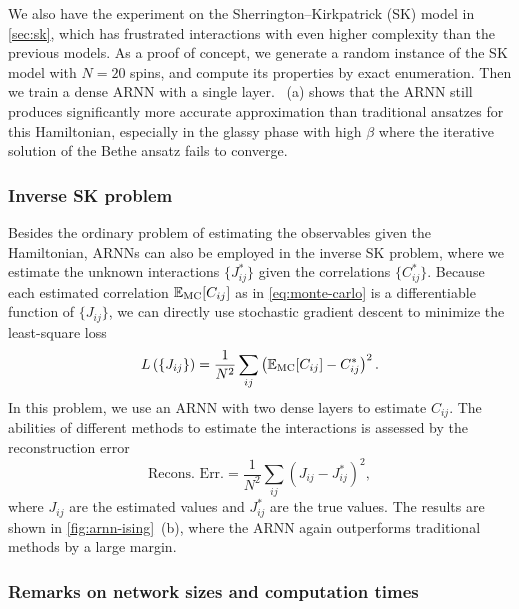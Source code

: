 We also have the experiment on the Sherrington--Kirkpatrick (SK) model in \cref{sec:sk}, which has frustrated interactions with even higher complexity than the previous models. As a proof of concept, we generate a random instance of the SK model with $N = 20$ spins, and compute its properties by exact enumeration. Then we train a dense ARNN with a single layer. ~(a) shows that the ARNN still produces significantly more accurate approximation than traditional ansatzes for this Hamiltonian, especially in the glassy phase with high $\beta$ where the iterative solution of the Bethe ansatz fails to converge.

\subsubsection{Inverse SK problem}

Besides the ordinary problem of estimating the observables given the Hamiltonian, ARNNs can also be employed in the inverse SK problem, where we estimate the unknown interactions $\{J^*_{i j}\}$ given the correlations $\{C^*_{i j}\}$. Because each estimated correlation $\mathbb{E}_\text{MC}[C_{i j}]$ as in \cref{eq:monte-carlo} is a differentiable function of $\{J_{i j}\}$, we can directly use stochastic gradient descent to minimize the least-square loss
\begin{equation}
L\left( \{J_{i j}\} \right) = \frac{1}{N^2} \sum_{i j} \left( \mathbb{E}_\text{MC}[C_{i j}] - C^*_{i j} \right)^2.
\end{equation}
In this problem, we use an ARNN with two dense layers to estimate $C_{i j}$. The abilities of different methods to estimate the interactions is assessed by the reconstruction error
\begin{equation}
\text{Recons. Err.} = \frac{1}{N^2} \sum_{i j} \left( J_{i j} - J^*_{i j} \right)^2,
\end{equation}
where $J_{i j}$ are the estimated values and $J^*_{i j}$ are the true values. The results are shown in \cref{fig:arnn-ising}~(b), where the ARNN again outperforms traditional methods by a large margin.

\subsubsection{Remarks on network sizes and computation times}


